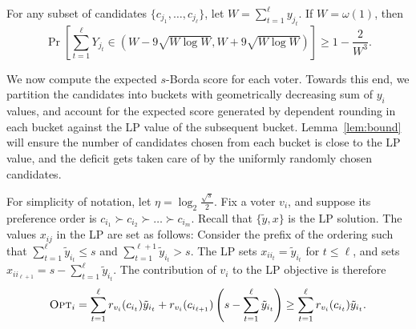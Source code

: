 \begin{lemma}
\label{lem:bound}
For any subset of candidates $\{c_{j_1}, \ldots, c_{j_\ell}\}$, let $W = \sum_{t = 1}^\ell y_{j_t}$. If $W = \omega(1)$, then 
$$\Pr\left[\sum_{t = 1}^\ell Y_{j_t} \in \left(W - 9\sqrt{W\log W}, W + 9\sqrt{W\log W}\right)\right] \geq 1 - \frac{2}{W^3}.$$
\end{lemma}

 We now compute the expected $s$-Borda score for each voter. Towards this end, we partition the candidates into buckets with geometrically decreasing sum of $y_i$ values, and account for the expected score generated by dependent rounding in each bucket against the LP value of the subsequent bucket. Lemma~\ref{lem:bound} will ensure the number of candidates chosen from each bucket is close to the LP value, and the deficit gets taken care of by the uniformly randomly chosen candidates.

For simplicity of notation, let $\eta = \log_2 \frac{\sqrt{s}}{2}$. Fix a voter $v_i$, and suppose its preference order is $c_{i_1} \succ c_{i_2} \succ \ldots \succ c_{i_m}$. Recall that $\{\tilde{y}, x\}$ is the LP solution. The values $x_{ij}$ in the LP are set as follows: Consider the prefix of the ordering such that $\sum_{t=1}^{\ell} \tilde{y}_{i_t} \le s$ and $\sum_{t=1}^{\ell+1} \tilde{y}_{i_t} > s$. The LP sets $x_{i i_t} = \tilde{y}_{i_t}$ for $t \le \ell$, and sets $x_{i i_{\ell+1}} = s - \sum_{t=1}^{\ell} \tilde{y}_{i_t}$. The contribution of $v_i$ to the LP objective is therefore
\begin{equation}
    \label{eq:opt1}
{\normalfont\textsc{Opt}}_i =  \sum_{t=1}^{\ell} r_{v_i}(c_{i_t}) \tilde{y}_{i_t} + r_{v_i}(c_{i_{\ell+1}}) \left(s - \sum_{t=1}^{\ell} \tilde{y}_{i_t} \right) \ge \sum_{t=1}^{\ell} r_{v_i}(c_{i_t}) \tilde{y}_{i_t}.
\end{equation}

